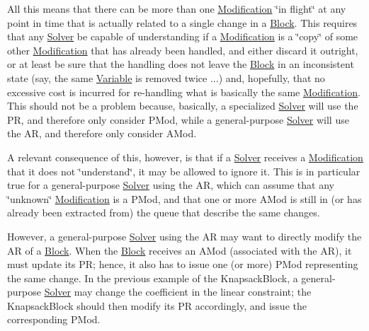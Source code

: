 All this means that there can be more than one \mbox{\hyperlink{class_s_m_spp__di__unipi__it_1_1_modification}{Modification}} \char`\"{}in flight\char`\"{} at any point in time that is actually related to a single change in a \mbox{\hyperlink{class_s_m_spp__di__unipi__it_1_1_block}{Block}}. This requires that any \mbox{\hyperlink{class_s_m_spp__di__unipi__it_1_1_solver}{Solver}} be capable of understanding if a \mbox{\hyperlink{class_s_m_spp__di__unipi__it_1_1_modification}{Modification}} is a \char`\"{}copy\char`\"{} of some other \mbox{\hyperlink{class_s_m_spp__di__unipi__it_1_1_modification}{Modification}} that has already been handled, and either discard it outright, or at least be sure that the handling does not leave the \mbox{\hyperlink{class_s_m_spp__di__unipi__it_1_1_block}{Block}} in an inconsistent state (say, the same \mbox{\hyperlink{class_s_m_spp__di__unipi__it_1_1_variable}{Variable}} is removed twice ...) and, hopefully, that no excessive cost is incurred for re-\/handling what is basically the same \mbox{\hyperlink{class_s_m_spp__di__unipi__it_1_1_modification}{Modification}}. This should not be a problem because, basically, a specialized \mbox{\hyperlink{class_s_m_spp__di__unipi__it_1_1_solver}{Solver}} will use the PR, and therefore only consider P\+Mod, while a general-\/purpose \mbox{\hyperlink{class_s_m_spp__di__unipi__it_1_1_solver}{Solver}} will use the AR, and therefore only consider A\+Mod.

A relevant consequence of this, however, is that if a \mbox{\hyperlink{class_s_m_spp__di__unipi__it_1_1_solver}{Solver}} receives a \mbox{\hyperlink{class_s_m_spp__di__unipi__it_1_1_modification}{Modification}} that it does not \char`\"{}understand\char`\"{}, it may be allowed to ignore it. This is in particular true for a general-\/purpose \mbox{\hyperlink{class_s_m_spp__di__unipi__it_1_1_solver}{Solver}} using the AR, which can assume that any \char`\"{}unknown\char`\"{} \mbox{\hyperlink{class_s_m_spp__di__unipi__it_1_1_modification}{Modification}} is a P\+Mod, and that one or more A\+Mod is still in (or has already been extracted from) the queue that describe the same changes.

However, a general-\/purpose \mbox{\hyperlink{class_s_m_spp__di__unipi__it_1_1_solver}{Solver}} using the AR may want to directly modify the AR of a \mbox{\hyperlink{class_s_m_spp__di__unipi__it_1_1_block}{Block}}. When the \mbox{\hyperlink{class_s_m_spp__di__unipi__it_1_1_block}{Block}} receives an A\+Mod (associated with the AR), it must update its PR; hence, it also has to issue one (or more) P\+Mod representing the same change. In the previous example of the Knapsack\+Block, a general-\/purpose \mbox{\hyperlink{class_s_m_spp__di__unipi__it_1_1_solver}{Solver}} may change the coefficient in the linear constraint; the Knapsack\+Block should then modify its PR accordingly, and issue the corresponding P\+Mod.


